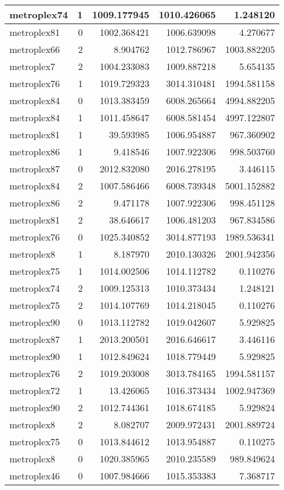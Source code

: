 \documentclass[../../../thesis.tex]{subfiles}
\begin{document}
\begin{longtable}{|l|r|r|r|r|}
metroplex74 & 1 & 1009.177945 & 1010.426065 & 1.248120 \\\hline
metroplex81 & 0 & 1002.368421 & 1006.639098 & 4.270677 \\\hline
metroplex66 & 2 & 8.904762 & 1012.786967 & 1003.882205 \\\hline
metroplex7 & 2 & 1004.233083 & 1009.887218 & 5.654135 \\\hline
metroplex76 & 1 & 1019.729323 & 3014.310481 & 1994.581158 \\\hline
metroplex84 & 0 & 1013.383459 & 6008.265664 & 4994.882205 \\\hline
metroplex84 & 1 & 1011.458647 & 6008.581454 & 4997.122807 \\\hline
metroplex81 & 1 & 39.593985 & 1006.954887 & 967.360902 \\\hline
metroplex86 & 1 & 9.418546 & 1007.922306 & 998.503760 \\\hline
metroplex87 & 0 & 2012.832080 & 2016.278195 & 3.446115 \\\hline
metroplex84 & 2 & 1007.586466 & 6008.739348 & 5001.152882 \\\hline
metroplex86 & 2 & 9.471178 & 1007.922306 & 998.451128 \\\hline
metroplex81 & 2 & 38.646617 & 1006.481203 & 967.834586 \\\hline
metroplex76 & 0 & 1025.340852 & 3014.877193 & 1989.536341 \\\hline
metroplex8 & 1 & 8.187970 & 2010.130326 & 2001.942356 \\\hline
metroplex75 & 1 & 1014.002506 & 1014.112782 & 0.110276 \\\hline
metroplex74 & 2 & 1009.125313 & 1010.373434 & 1.248121 \\\hline
metroplex75 & 2 & 1014.107769 & 1014.218045 & 0.110276 \\\hline
metroplex90 & 0 & 1013.112782 & 1019.042607 & 5.929825 \\\hline
metroplex87 & 1 & 2013.200501 & 2016.646617 & 3.446116 \\\hline
metroplex90 & 1 & 1012.849624 & 1018.779449 & 5.929825 \\\hline
metroplex76 & 2 & 1019.203008 & 3013.784165 & 1994.581157 \\\hline
metroplex72 & 1 & 13.426065 & 1016.373434 & 1002.947369 \\\hline
metroplex90 & 2 & 1012.744361 & 1018.674185 & 5.929824 \\\hline
metroplex8 & 2 & 8.082707 & 2009.972431 & 2001.889724 \\\hline
metroplex75 & 0 & 1013.844612 & 1013.954887 & 0.110275 \\\hline
metroplex8 & 0 & 1020.385965 & 2010.235589 & 989.849624 \\\hline
metroplex46 & 0 & 1007.984666 & 1015.353383 & 7.368717 \\\hline
\end{longtable}
\end{document}
